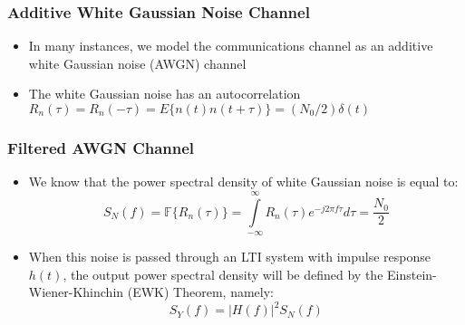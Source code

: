 \documentclass[10pt]{beamer}
\begin{document}
\frame
{
  \frametitle{Additive White Gaussian Noise Channel}

  \begin{itemize}
    \item In many instances, we model the communications channel as an additive white Gaussian noise (AWGN) channel
    \item The white Gaussian noise has an autocorrelation $R_n(\tau)=R_n(-\tau)=E\{n(t)n(t+\tau)\}=(N_0/2)\delta(t)$
  \end{itemize}

}
\frame
{
  \frametitle{Filtered AWGN Channel}

  \begin{itemize}
    \item We know that the power spectral density of white Gaussian noise is equal to:
    \begin{equation}
        S_N(f)=\mathbb{F}\{R_n(\tau)\}=\int\limits_{-\infty}^{\infty}R_n(\tau)e^{-j2\pi{f}\tau}d\tau=\frac{N_0}{2}
    \end{equation}
    \item When this noise is passed through an LTI system with impulse response $h(t)$, the output power spectral density will be defined by the Einstein-Wiener-Khinchin (EWK) Theorem, namely:
    \begin{equation}
        S_Y(f)=|H(f)|^2S_N(f)
    \end{equation}
  \end{itemize}

}
\end{document}

